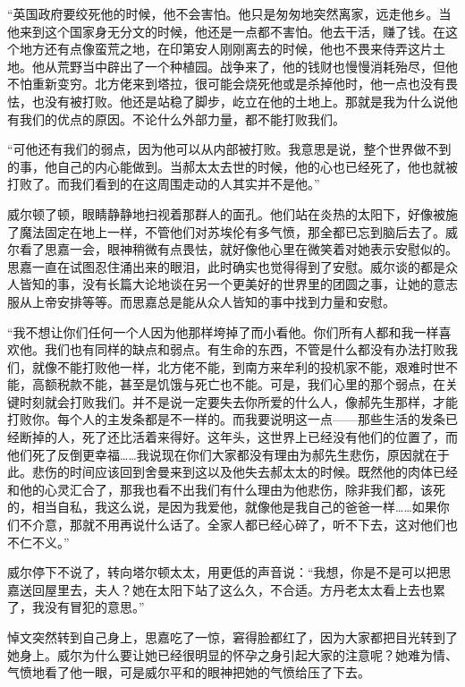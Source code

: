 \par “英国政府要绞死他的时候，他不会害怕。他只是匆匆地突然离家，远走他乡。当他来到这个国家身无分文的时候，他还是一点都不害怕。他去干活，赚了钱。在这个地方还有点像蛮荒之地，在印第安人刚刚离去的时候，他也不畏来侍弄这片土地。他从荒野当中辟出了一个种植园。战争来了，他的钱财也慢慢消耗殆尽，但他不怕重新变穷。北方佬来到塔拉，很可能会烧死他或是杀掉他时，他一点也没有畏怯，也没有被打败。他还是站稳了脚步，屹立在他的土地上。那就是我为什么说他有我们的优点的原因。不论什么外部力量，都不能打败我们。
\par “可他还有我们的弱点，因为他可以从内部被打败。我意思是说，整个世界做不到的事，他自己的内心能做到。当郝太太去世的时候，他的心也已经死了，他也就被打败了。而我们看到的在这周围走动的人其实并不是他。”
\par 威尔顿了顿，眼睛静静地扫视着那群人的面孔。他们站在炎热的太阳下，好像被施了魔法固定在地上一样，不管他们对苏埃伦有多气愤，那全都已忘到脑后去了。威尔看了思嘉一会，眼神稍微有点畏怯，就好像他心里在微笑着对她表示安慰似的。思嘉一直在试图忍住涌出来的眼泪，此时确实也觉得得到了安慰。威尔谈的都是众人皆知的事，没有长篇大论地谈在另一个更美好的世界里的团圆之事，让她的意志服从上帝安排等等。而思嘉总是能从众人皆知的事中找到力量和安慰。
\par “我不想让你们任何一个人因为他那样垮掉了而小看他。你们所有人都和我一样喜欢他。我们也有同样的缺点和弱点。有生命的东西，不管是什么都没有办法打败我们，就像不能打败他一样，北方佬不能，到南方来牟利的投机家不能，艰难时世不能，高额税款不能，甚至是饥饿与死亡也不能。可是，我们心里的那个弱点，在关键时刻就会打败我们。并不是说一定要失去你所爱的什么人，像郝先生那样，才能打败你。每个人的主发条都是不一样的。而我要说明这一点——那些生活的发条已经断掉的人，死了还比活着来得好。这年头，这世界上已经没有他们的位置了，而他们死了反倒更幸福……我说现在你们大家都没有理由为郝先生悲伤，原因就在于此。悲伤的时间应该回到舍曼来到这以及他失去郝太太的时候。既然他的肉体已经和他的心灵汇合了，那我也看不出我们有什么理由为他悲伤，除非我们都，该死的，相当自私，我这么说，是因为我爱他，就像他是我自己的爸爸一样……如果你们不介意，那就不用再说什么话了。全家人都已经心碎了，听不下去，这对他们也不仁不义。”
\par 威尔停下不说了，转向塔尔顿太太，用更低的声音说：“我想，你是不是可以把思嘉送回屋里去，夫人？她在太阳下站了这么久，不合适。方丹老太太看上去也累了，我没有冒犯的意思。”
\par 悼文突然转到自己身上，思嘉吃了一惊，窘得脸都红了，因为大家都把目光转到了她身上。威尔为什么要让她已经很明显的怀孕之身引起大家的注意呢？她难为情、气愤地看了他一眼，可是威尔平和的眼神把她的气愤给压了下去。

